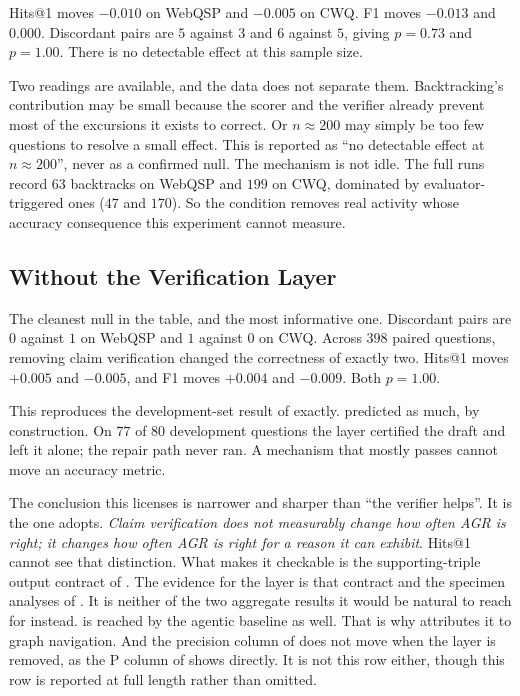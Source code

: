 Hits@1 moves $-0.010$ on WebQSP and $-0.005$ on CWQ. F1 moves $-0.013$ and
$0.000$. Discordant pairs are $5$ against $3$ and $6$
against $5$, giving $p = 0.73$ and $p = 1.00$. There is no detectable effect at
this sample size.

Two readings are available, and the data does not separate them. Backtracking's
contribution may be small because the scorer and the verifier already prevent
most of the excursions it exists to correct. Or $n \approx 200$ may simply be
too few questions to resolve a small effect. This is reported as ``no detectable
effect at $n \approx 200$'', never as a confirmed null. The mechanism is not
idle. The full runs record $63$ backtracks on WebQSP and $199$ on CWQ, dominated
by evaluator-triggered ones ($47$ and $170$). So the condition removes real
activity whose accuracy consequence this experiment cannot measure.

\subsection{Without the Verification Layer}

The cleanest null in the table, and the most informative one. Discordant pairs
are $0$ against $1$ on WebQSP and $1$ against $0$ on
CWQ. Across $398$ paired questions, removing claim verification changed the
correctness of exactly two. Hits@1 moves $+0.005$ and $-0.005$, and F1 moves
$+0.004$ and $-0.009$. Both $p = 1.00$.

This reproduces the development-set result of  exactly.
 predicted as much, by construction. On $77$ of
$80$ development questions the layer certified the draft and left it alone; the
repair path never ran. A mechanism that mostly passes cannot move an accuracy
metric.

The conclusion this licenses is narrower and sharper than ``the verifier
helps''. It is the one  adopts. \emph{Claim verification does
not measurably change how often AGR is right; it changes how often AGR is right
for a reason it can exhibit}. Hits@1 cannot see that distinction. What makes it
checkable is the supporting-triple output contract of
. The evidence for the layer is that contract and the
specimen analyses of . It is neither of the two
aggregate results it would be natural to reach for instead.
 is reached by the agentic baseline as well. That is why
 attributes it to graph navigation. And the precision column
of  does not move when the layer is removed, as the P column of
 shows directly. It is not this row either, though this row
is reported at full length rather than omitted.


